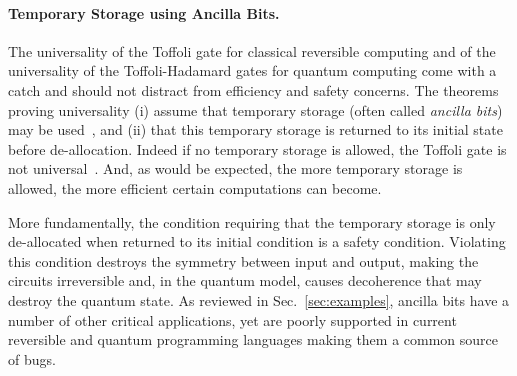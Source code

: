 \documentclass[sigplan,10pt,review,anonymous]{acmart}
\begin{document}
\paragraph*{Temporary Storage using Ancilla Bits.} The universality of
the Toffoli gate for classical reversible computing and of the
universality of the Toffoli-Hadamard gates for quantum computing come
with a catch and should
not distract from efficiency and safety concerns. The theorems proving
universality (i) assume that temporary storage (often called
\emph{ancilla bits}) may be used~\cite{Toffoli:1980}, and (ii) that
this temporary storage is returned to its initial state before
de-allocation. Indeed if no temporary storage is allowed, the Toffoli
gate is not
universal~\cite{aaronson_et_al:LIPIcs:2017:8173,DBLP:journals/corr/Xu15e}.
And, as would be expected, the more temporary storage is allowed, the
more efficient certain computations can become.

More fundamentally, the condition requiring that the temporary storage
is only de-allocated when returned to its initial condition is a
safety condition. Violating this condition destroys the symmetry
between input and output, making the circuits irreversible and, in
the quantum model, causes decoherence that may destroy the quantum
state. As reviewed in Sec.~\ref{sec:examples}, ancilla bits have a
number of other critical applications, yet are poorly supported in
current reversible and quantum programming languages making them a
common source of bugs.
\end{document}
